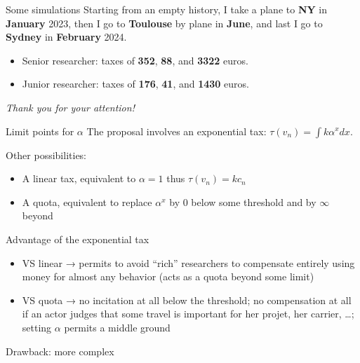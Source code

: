 \documentclass[french, english]{beamer}
\begin{document}
\begin{frame}{Some simulations}
    Starting from an empty history, I take a plane to \textbf{NY} in \textbf{January} 2023, then I go to \textbf{Toulouse} by plane in \textbf{June}, and  last I go to \textbf{Sydney} in \textbf{February} 2024. 
    \begin{itemize}
    \item Senior researcher: taxes of \textbf{352}, \textbf{88}, and \textbf{3322} euros.
    \item Junior researcher: taxes of \textbf{176}, \textbf{41}, and \textbf{1430} euros. 
    \end{itemize}
\end{frame}

\begin{frame}[plain]
	\addtocounter{framenumber}{-1}
	\begin{center}
		\huge
		\textit{Thank you for your attention!}
	\end{center}
\end{frame}

\appendix
\begin{frame}{Limit points for $α$}
    The proposal involves an exponential tax: $τ(v_n) = \int k \alpha^x dx$.

    Other possibilities:
    \begin{itemize}
    \item A linear tax, equivalent to $α = 1$ thus $τ(v_n) = k c_n$
    \item A quota, equivalent to replace $α^x$ by $0$ below some threshold and by $∞$ beyond
    \end{itemize}
    Advantage of the exponential tax
    \begin{itemize}
    	\item VS linear → permits to avoid “rich” researchers to compensate entirely using money for almost any behavior (acts as a quota beyond some limit)
    	\item VS quota → no incitation at all below the threshold; no compensation at all if an actor judges that some travel is important for her projet, her carrier, …; setting $α$ permits a middle ground
    \end{itemize}
    Drawback: more complex
\end{frame}
\end{document}

